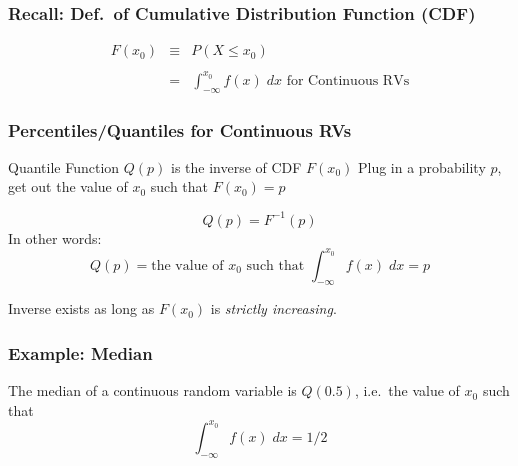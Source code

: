 \documentclass[handout]{beamer}
\begin{document}
\begin{frame}
\frametitle{Recall: Def.\ of Cumulative Distribution Function (CDF)}


\begin{eqnarray*}
F(x_0) &\equiv& P(X \leq x_0) \\ \\
		&=& \int_{-\infty}^{x_0} f(x)\; dx \mbox{ for Continuous RVs}
\end{eqnarray*}


\end{frame}
\begin{frame}
\frametitle{Percentiles/Quantiles for Continuous RVs}
\begin{block}{Quantile Function $Q(p)$ is the inverse of CDF $F(x_0)$}
Plug in a probability $p$, get out the value of $x_0$ such that $F(x_0)=p$
\end{block}
$$Q(p) = F^{-1}(p)$$
\pause
In other words:
	$$Q(p) = \mbox{the value of } x_0 \mbox{ such that } \int_{-\infty}^{x_0} f(x) \; dx = p$$
	
\begin{alertblock}{Inverse exists as long as $F(x_0)$ is \emph{strictly increasing}.} \end{alertblock}	
	
\end{frame}
\begin{frame}
\frametitle{Example: Median}
The median of a continuous random variable is $Q(0.5)$, i.e.\ the value of $x_0$ such that 
	$$\int_{-\infty}^{x_0} f(x)\; dx = 1/2$$
\end{frame}
\end{document}
